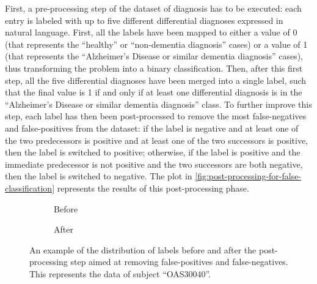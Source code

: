 \documentclass[10pt,twocolumn,letterpaper]{article}
\begin{document}
First, a pre-processing step of the dataset of diagnosis has to be executed:
each entry is labeled with up to five different differential diagnoses expressed
in natural language. First, all the labels have been mapped to either a value of
0 (that represents the ``healthy'' or ``non-dementia diagnosis'' cases) or a
value of 1 (that represents the ``Alzheimer's Disease or similar dementia
diagnosis'' cases), thus transforming the problem into a binary classification.
Then, after this first step, all the five differential diagnoses have been
merged into a single label, such that the final value is 1 if and only if at
least one differential diagnosis is in the ``Alzheimer's Disease or similar
dementia diagnosis'' class. To further improve this step, each label has then
been post-processed to remove the most false-negatives and false-positives from
the dataset: if the label is negative and at least one of the two predecessors
is positive and at least one of the two successors is positive, then the label
is switched to positive; otherwise, if the label is positive and the immediate
predecessor is not positive and the two successors are both negative, then the
label is switched to negative. The plot in
\autoref{fig:post-processing-for-false-classification} represents the results of
this post-processing phase.

\begin{figure}[h]
  \centering
  \begin{subfigure}[t]{\linewidth}
    \centering
    \caption{Before}
  \end{subfigure}
  \begin{subfigure}[t]{\linewidth}
    \centering
    \caption{After}
  \end{subfigure}
  \caption{An example of the distribution of labels before and after the post-processing step aimed at removing false-positives and false-negatives. This represents the data of subject ``OAS30040''.}
  \label{fig:post-processing-for-false-classification}
\end{figure}
\end{document}

